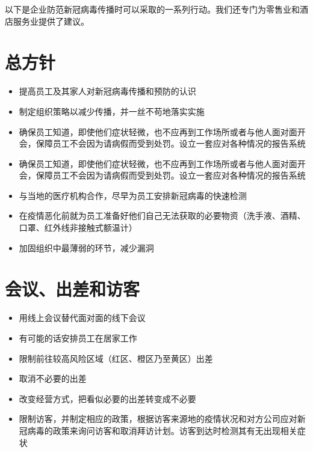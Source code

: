 \documentclass[onecolumn,journal]{IEEEtran}
\begin{document}
\begin{multicols}{2}


以下是企业防范新冠病毒传播时可以采取的一系列行动。我们还专门为零售业和酒店服务业提供了建议。


\section*{总方针}
\begin{itemize}
\item 提高员工及其家人对新冠病毒传播和预防的认识
\item 制定组织策略以减少传播，并一丝不苟地落实实施
\item 确保员工知道，即使他们症状轻微，也不应再到工作场所或者与他人面对面开会，保障员工不会因为请病假而受到处罚。设立一套应对各种情况的报告系统
\item 确保员工知道，即使他们症状轻微，也不应再到工作场所或者与他人面对面开会，保障员工不会因为请病假而受到处罚。设立一套应对各种情况的报告系统
\item 与当地的医疗机构合作，尽早为员工安排新冠病毒的快速检测
\item 在疫情恶化前就为员工准备好他们自己无法获取的必要物资（洗手液、酒精、口罩、红外线非接触式额温计）
\item 加固组织中最薄弱的环节，减少漏洞
\end{itemize}

\section*{会议、出差和访客}
\begin{itemize}
\item 用线上会议替代面对面的线下会议
\item 有可能的话安排员工在居家工作
\item 限制前往较高风险区域（红区、橙区乃至黄区）出差
\item 取消不必要的出差
\item 改变经营方式，把看似必要的出差转变成不必要
\item 限制访客，并制定相应的政策，根据访客来源地的疫情状况和对方公司应对新冠病毒的政策来询问访客和取消拜访计划。访客到达时检测其有无出现相关症状
\end{itemize}


\end{multicols}
\end{document}
